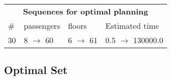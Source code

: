 \documentclass{article}
\begin{document}
                            \begin{center}
                            \begin{tabular}{@{}l|l|l|l@{}}
                            \multicolumn{4}{c}{\bf \large Sequences for optimal planning}\\
                            \# & passengers & floors & Estimated time\\\midrule
                            30&8 $\rightarrow$ 60&6 $\rightarrow$ 61&0.5 $\rightarrow$ 130000.0
                            \end{tabular}
                            \end{center}
                    
                                \subsection*{Optimal Set}
                                
\end{document}
